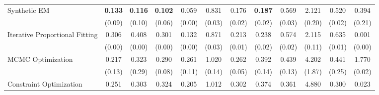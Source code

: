 \begin{table}[ht]
{\begin{tabular}{l cccc cccc cc c}
            \addlinespace[0.2em]
            Synthetic EM                   & \textbf{0.133}                                  & \textbf{0.116}                               & \textbf{0.102}                                & 0.059                   & 0.831            & 0.176          & \textbf{0.187} & 0.569          & 2.121           & 0.520          & 0.394             \\
                                           & (0.09)                                          & (0.10)                                       & (0.06)                                        & (0.00)                  & (0.03)           & (0.02)         & (0.02)         & (0.03)         & (0.20)          & (0.02)         & (0.21)            \\
            \addlinespace[0.2em]
            Iterative Proportional Fitting & 0.306                                           & 0.408                                        & 0.301                                         & 0.132                   & 0.871            & 0.213          & 0.238          & 0.574          & 2.115           & 0.635          & 0.001             \\
                                           & (0.00)                                          & (0.00)                                       & (0.00)                                        & (0.00)                  & (0.03)           & (0.01)         & (0.02)         & (0.02)         & (0.11)          & (0.01)         & (0.00)            \\
            \addlinespace[0.2em]
            MCMC Optimization              & 0.217                                           & 0.323                                        & 0.290                                         & 0.261                   & 1.020            & 0.262          & 0.392          & 0.439          & 4.202           & 0.441          & 1.770             \\
                                           & (0.13)                                          & (0.29)                                       & (0.08)                                        & (0.11)                  & (0.14)           & (0.05)         & (0.14)         & (0.13)         & (1.87)          & (0.25)         & (0.02)            \\
            \addlinespace[0.2em]
            Constraint Optimization        & 0.251                                           & 0.303                                        & 0.324                                         & 0.205                   & 1.012            & 0.302          & 0.374          & 0.361          & 4.880           & 0.300          & 0.023             \\

\end{tabular}}
\end{table}
